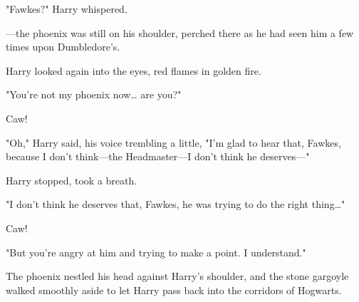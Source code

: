"Fawkes?" Harry whispered.

---the phoenix was still on his shoulder, perched there as he had seen him a 
few times upon Dumbledore's.

Harry looked again into the eyes, red flames in golden fire.

"You're not my phoenix now{\ldots} are you?"

Caw!

"Oh," Harry said, his voice trembling a little, "I'm glad to hear that, Fawkes, 
because I don't think---the Headmaster---I don't think he deserves---"

Harry stopped, took a breath.

"I don't think he deserves that, Fawkes, he was trying to do the right 
thing{\ldots}"

Caw!

"But you're angry at him and trying to make a point. I understand."

The phoenix nestled his head against Harry's shoulder, and the stone gargoyle 
walked smoothly aside to let Harry pass back into the corridors of Hogwarts.
